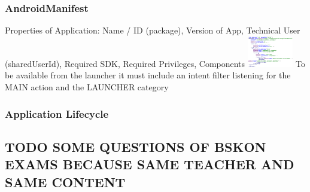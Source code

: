 \subsubsection{AndroidManifest}
Properties of Application: Name / ID (package), Version of App, Technical User
(sharedUserId), Required SDK, Required Privileges, Components
\includegraphics[width=0.15\textwidth]{android/manifest.png}
To be available from the launcher it must include an intent filter listening
for the MAIN action and the LAUNCHER category

\subsubsection{Application Lifecycle}


\newpage
\subsection{TODO SOME QUESTIONS OF BSKON EXAMS BECAUSE SAME TEACHER AND SAME CONTENT}
